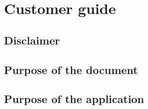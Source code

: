 \section{Customer guide} \label{_cliente}
\subsection{Disclaimer}

\subsection{Purpose of the document}

\subsection{Purpose of the application}
